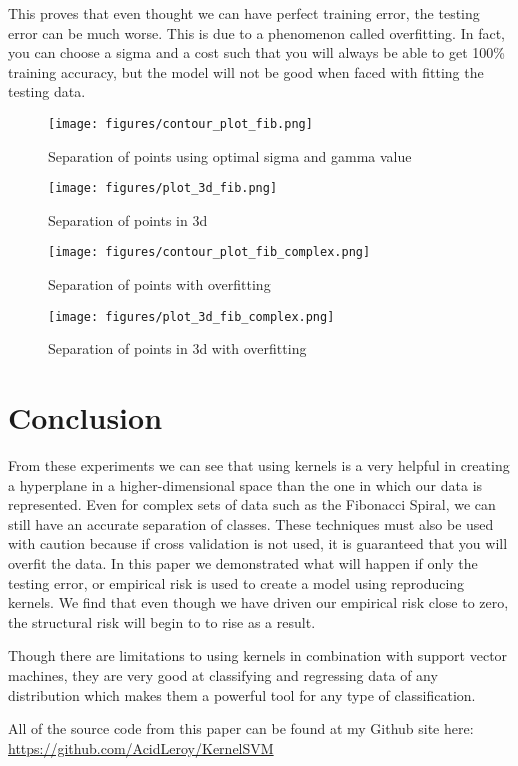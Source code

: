 \documentclass[11pt, twoside]{article}   	%
\begin{document}
This proves that even thought we can have perfect training error, the testing
error can be much worse. This is due to a phenomenon called overfitting. In fact, 
you can choose a sigma and a cost such that you will always be able to get 
100\% training accuracy, but the model will not be good when faced with fitting
the testing data. 

\begin{figure}[h]
\centering
\texttt{[image: figures/contour\_plot\_fib.png]}
\caption{Separation of points using optimal sigma and gamma value}
\label{fig:sigma_gamma_fib} 
\end{figure}


\begin{figure}[h]
\centering
\texttt{[image: figures/plot\_3d\_fib.png]}
\caption{Separation of points in 3d}
\label{fig:plot_3d_fib} 
\end{figure}

\begin{figure}[h]
\centering
\texttt{[image: figures/contour\_plot\_fib\_complex.png]}
\caption{Separation of points with overfitting}
\label{fig:sigma_gamma_fib_overfit} 
\end{figure}


\begin{figure}[h]
\centering
\texttt{[image: figures/plot\_3d\_fib\_complex.png]}
\caption{Separation of points in 3d with overfitting}
\label{fig:plot_3d_fib_overfit} 
\end{figure}

\section{Conclusion}
From these experiments we can see that using kernels is a very helpful in creating a hyperplane
in a higher-dimensional space than the one in which our data is represented. 
Even for complex sets of data such as the Fibonacci Spiral, 
we can still have an accurate separation of classes. These techniques must also be used
with caution because if cross validation is not used, it is guaranteed that you will overfit the data. In this paper we
 demonstrated what will 
happen if only the testing error, or empirical risk is used to create a model using reproducing 
kernels. We find that even though we have driven our empirical risk close to zero, the structural 
risk will begin to to rise as a result. 

Though there are limitations to using kernels in combination with support vector machines, they are very 
good at classifying and regressing data of any distribution which makes them a powerful tool 
for any type of classification.

All of the source code from this paper can be found at my Github site here: 
\href{https://github.com/AcidLeroy/KernelSVM}{https://github.com/AcidLeroy/KernelSVM}





\end{document}
